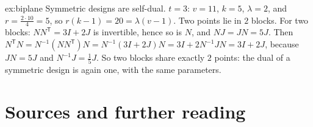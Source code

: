 \begin{solution}{ex:biplane}
\idea Symmetric designs are self-dual.
\writeup $t=3$: $v=11$, $k=5$, $\lambda=2$, and $r=\frac{2\cdot10}{4}=5$, so $r(k-1)=20=\lambda(v-1)$. Two points lie in $2$ blocks. For two blocks:
$NN^{\mathsf T}=3I+2J$ is invertible, hence so is $N$, and $NJ=JN=5J$. Then $N^{\mathsf T}N=N^{-1}(NN^{\mathsf T})N=N^{-1}(3I+2J)N=3I+2N^{-1}JN=3I+2J$,
because $JN=5J$ and $N^{-1}J=\frac15J$. So two blocks share exactly $2$ points: the dual of a symmetric design is again one, with the same parameters.
\end{solution}

\section*{Sources and further reading}

